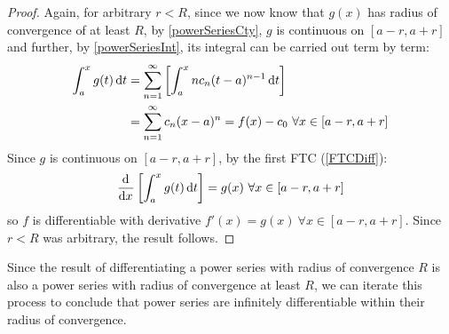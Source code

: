 \documentclass[../main.tex]{subfiles}
\begin{document}
\begin{proof}
  Again, for arbitrary $r < R$, since we now know that $g(x)$ has radius of convergence of at least $R$, by \cref{powerSeriesCty}, $g$ is continuous on $[a - r, a + r]$ and further, by \cref{powerSeriesInt}, its integral can be carried out term by term:
  \begin{align*}
    \int_{a}^{x} g(t) \d{t} &= \sum_{n = 1}^{\infty} \left[\int_{a}^{x} nc_n(t - a)^{n - 1} \d{t}\right] \\
                            &= \sum_{n = 1}^{\infty} c_n(x - a)^{n} = f(x) - c_0\ \forall x \in [a - r, a + r]
  \end{align*}
  Since $g$ is continuous on $[a - r, a + r]$, by the first FTC (\cref{FTCDiff}):
  \[
    \deriv{}{x}\left[\int_{a}^{x} g(t) \d{t}\right] = g(x)\ \forall x \in [a - r, a + r]
  \]
  so $f$ is differentiable with derivative $f'(x) = g(x)\ \forall x \in [a - r, a + r]$.
  Since $r < R$ was arbitrary, the result follows.
\end{proof}
\begin{remark}
  Since the result of differentiating a power series with radius of convergence $R$ is also a power series with radius of convergence at least $R$, we can iterate this process to conclude that power series are infinitely differentiable within their radius of convergence.
\end{remark}
\end{document}
